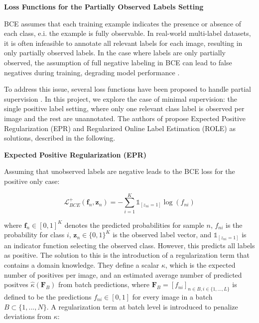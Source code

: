 \documentclass[lettersize,journal]{IEEEtran}
\renewcommand{\paragraph}[1]{%
  \vspace{1.5ex}\textbf{#1}\quad
}
\begin{document}
\paragraph{Loss Functions for the Partially Observed Labels Setting}
BCE assumes that each training example indicates the presence or absence of each class, e.i. the example is fully observable. In real-world multi-label datasets, it is often infeasible to annotate all relevant labels for each image, resulting in only partially observed labels. In the case where labels are only partially observed, the assumption of full negative labeling in BCE can lead to false negatives during training, degrading model performance \cite{mlsp}. 

To address this issue, several loss functions have been proposed to handle partial supervision \cite{mlsp}. In this project, we explore the case of minimal supervision: the single positive label setting, where only one relevant class label is observed per image and the rest are unannotated. The authors of \cite{mlsp} propose Expected Positive Regularization (EPR) and Regularized Online Label Estimation (ROLE) as solutions, described in the following.

\paragraph{Expected Positive Regularization (EPR)}
Assuming that unobserved labels are negative leads to the BCE loss for the positive only case:

\begin{equation}
    \mathcal{L}_{BCE}^+(\mathbf{f}_n,\mathbf{z}_n) = - \sum_{i=1}^{K}\mathds{1}_{[z_{ni}=1]}\log(f_{ni})
\end{equation}

\noindent where $\mathbf{f}_n\in[0,1]^K$ denotes the predicted probabilities for sample $n$, $f_{ni}$ is the probability for class $i$, $\mathbf{z}_n\in\{0,1\}^K$  is the observed label vector, and $\mathds{1}_{[z_{ni}=1]}$ is an indicator function selecting the observed class. However, this predicts all labels as positive. The solution to this is the introduction of a regularization term that contains a domain knowledge. They define a scalar $\kappa$, which is the expected number of positives per image, and an estimated average number of predicted positves $\hat{\kappa}(\mathbf{F}_B)$ from batch predictions, where $\mathbf{F}_B = [f_{ni}]_{n\in B,i\in\{1,...,L\}}$ is defined to be the predictions $f_{ni}\in[0,1]$ for every image in a batch $B\subset \{1,...,N\}$. A regularization term at batch level is introduced to penalize deviations from $\kappa$:
\end{document}
